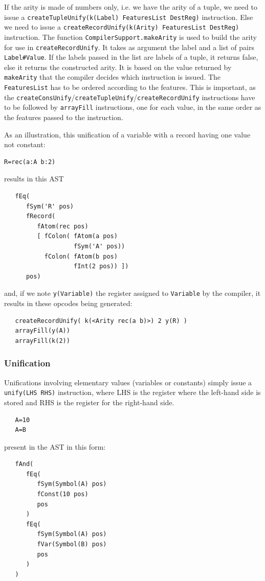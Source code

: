 \documentclass[a4paper]{memoir}
\begin{document}
If the arity is made of numbers only, i.e. we have the arity of a tuple, we need
to issue a \lstinline!createTupleUnify(k(Label) FeaturesList DestReg)!
instruction. Else we need to issue a \lstinline!createRecordUnify(k(Arity) FeaturesList DestReg)! instruction.
The function \lstinline!CompilerSupport.makeArity! is used to build the arity
for use in \lstinline!createRecordUnify!. It takes as argument the label and a list of pairs \lstinline!Label#Value!. If the labels passed in the list are labels of a tuple, it returns false, else it returns the constructed arity. It is based on the value returned by \lstinline!makeArity! that the compiler decides which instruction is issued.
The \lstinline!FeaturesList! has to be ordered according to the features. This
is important, as the
\lstinline!createConsUnify!/\lstinline!createTupleUnify!/\lstinline!createRecordUnify! instructions have to be followed by \lstinline!arrayFill! instructions, one for each value, in the same order as the features passed to the instruction.

As an illustration, this unification of a variable with a record having one value not constant:
\begin{lstlisting}
R=rec(a:A b:2)
\end{lstlisting}
results in this AST
\begin{lstlisting}
   fEq(
      fSym('R' pos)
      fRecord(
         fAtom(rec pos)
         [ fColon( fAtom(a pos)
                   fSym('A' pos))
           fColon( fAtom(b pos)
                   fInt(2 pos)) ])
      pos)
\end{lstlisting}
and, if we note \lstinline!y(Variable)! the register assigned to \lstinline!Variable! by the compiler, it results in these opcodes being generated:

\begin{lstlisting}
   createRecordUnify( k(<Arity rec(a b)>) 2 y(R) )
   arrayFill(y(A))
   arrayFill(k(2)) 
\end{lstlisting}

\subsubsection{Unification}
Unifications involving elementary values (variables or constants) simply issue a \lstinline!unify(LHS RHS)! instruction, where LHS is the register where the left-hand side is stored and RHS is the register for the right-hand side.
\begin{lstlisting}
   A=10
   A=B
\end{lstlisting}
present in the AST in this form:
\begin{lstlisting}
   fAnd(
      fEq(
         fSym(Symbol(A) pos)
         fConst(10 pos)
         pos
      )
      fEq(
         fSym(Symbol(A) pos)
         fVar(Symbol(B) pos)
         pos
      )
   )
\end{lstlisting}
\end{document}
